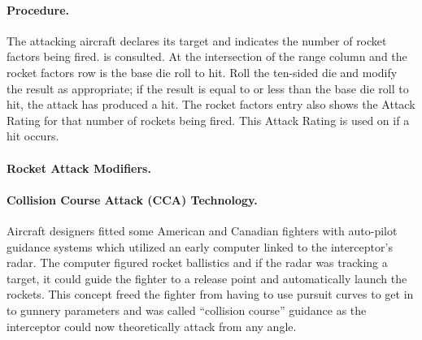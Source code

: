 \begin{advancedrules}
{\paragraph{Procedure.} The attacking aircraft declares its target and indicates the number of rocket factors being fired.  is consulted. At the intersection of the range column and the rocket factors row is the base die roll to hit. Roll the ten-sided die and modify the result as appropriate; if the result is equal to or less than the base die roll to hit, the attack has produced a hit. The rocket factors entry also shows the Attack Rating for that number of rockets being fired. This Attack Rating is used on  if a hit occurs.

\paragraph{Rocket Attack Modifiers.} 

\paragraph{Collision Course Attack (CCA) Technology.} Aircraft designers fitted some American and Canadian fighters with auto-pilot guidance systems which utilized an early computer linked to the interceptor's radar. The computer figured rocket ballistics and if the radar was tracking a target, it could guide the fighter to a release point and automatically launch the rockets. This concept freed the fighter from having to use pursuit curves to get in to gunnery parameters and was called “collision course” guidance as the interceptor could now theoretically attack from any angle.

}
\end{advancedrules}
